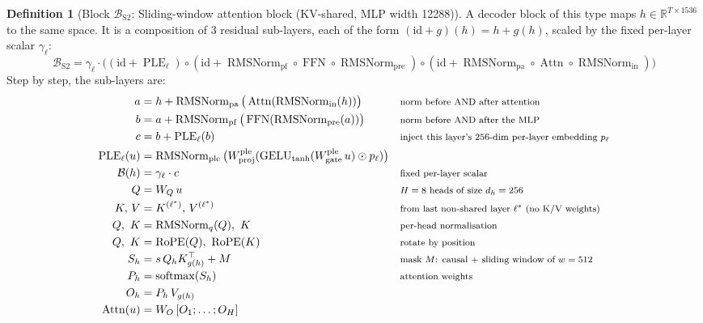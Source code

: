 \documentclass[10pt,a4paper]{article}
\newcommand{\op}[1]{\operatorname{#1}}
\theoremstyle{definition}
\newtheorem{definition}{Definition}[section]
\begin{document}
\begin{definition}[Block $\mathcal{B}_{\mathrm{S2}}$: Sliding-window attention block (KV-shared, MLP width 12288)]
A decoder block of this type maps $h\in\mathbb{R}^{T\times 1536}$ to the same space. It is a composition of 3 residual sub-layers, each of the form $(\mathrm{id}+g)(h)=h+g(h)$, scaled by the fixed per-layer scalar $\gamma_\ell$:
\begin{equation}
  \mathcal{B}_{\mathrm{S2}} = \gamma_\ell\cdot\big((\mathrm{id}+\op{PLE}_\ell)\circ(\mathrm{id}+\op{RMSNorm}_{\mathrm{pf}}\circ\op{FFN}\circ \op{RMSNorm}_{\mathrm{pre}})\circ(\mathrm{id}+\op{RMSNorm}_{\mathrm{pa}}\circ \op{Attn}\circ \op{RMSNorm}_{\mathrm{in}})\big)
\end{equation}
Step by step, the sub-layers are:
\begin{align*}
  a &= h + \op{RMSNorm}_{\mathrm{pa}}\big(\op{Attn}(\op{RMSNorm}_{\mathrm{in}}(h))\big) && \text{\footnotesize norm before AND after attention} \\
  b &= a + \op{RMSNorm}_{\mathrm{pf}}\big(\op{FFN}(\op{RMSNorm}_{\mathrm{pre}}(a))\big) && \text{\footnotesize norm before AND after the MLP} \\
  c &= b + \op{PLE}_\ell(b) && \text{\footnotesize inject this layer's 256-dim per-layer embedding $p_\ell$} \\
  \op{PLE}_\ell(u) &= \op{RMSNorm}_{\mathrm{ple}}\big(W^{\mathrm{ple}}_{\mathrm{proj}}(\op{GELU}_{\tanh}(W^{\mathrm{ple}}_{\mathrm{gate}}\,u)\odot p_\ell)\big) \\
  \mathcal{B}(h) &= \gamma_\ell\cdot c && \text{\footnotesize fixed per-layer scalar} \\
  Q &= W_Q\,u && \text{\footnotesize $H=8$ heads of size $d_h=256$} \\
  K,\,V &= K^{(\ell^*)},\,V^{(\ell^*)} && \text{\footnotesize from last non-shared layer $\ell^*$ (no K/V weights)} \\
  Q,\ K &= \op{RMSNorm}_q(Q),\ K && \text{\footnotesize per-head normalisation} \\
  Q,\ K &= \op{RoPE}(Q),\ \op{RoPE}(K) && \text{\footnotesize rotate by position} \\
  S_h &= s\, Q_h K_{g(h)}^{\top} + M && \text{\footnotesize mask $M$: causal + sliding window of $w=512$} \\
  P_h &= \op{softmax}(S_h) && \text{\footnotesize attention weights} \\
  O_h &= P_h\, V_{g(h)} \\
  \op{Attn}(u) &= W_O\,[O_1;\dots;O_H] \\

\end{align*}
\end{definition}
\end{document}
